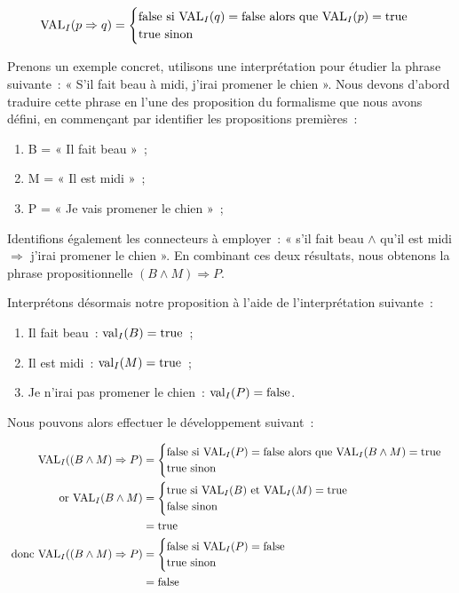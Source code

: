 \[\mathrm{VAL}_I(p \Rightarrow q) = \begin{cases}
  \mathrm{false} \mbox{ si } \mathrm{VAL}_I(q) = \mathrm{false} \mbox{ alors que } \mathrm{VAL}_I(p) = \mathrm{true} \\
  \mathrm{true}\mbox{ sinon}
\end{cases}\]

Prenons un exemple concret, utilisons une interprétation pour étudier la phrase
suivante~: « S'il fait beau à midi, j'irai promener le chien ». Nous devons
d’abord traduire cette phrase en l’une des proposition du formalisme que nous
avons défini, en commençant par identifier les propositions premières~:

\begin{enumerate}
\item B = « Il fait beau »~;
\item M = « Il est midi »~;
\item P = « Je vais promener le chien »~;
\end{enumerate}

Identifions également les connecteurs à employer~: « s’il fait beau $\land$
  qu'il est midi $\Rightarrow$ j’irai promener le chien ». En combinant ces deux
résultats, nous obtenons la phrase propositionnelle $(B \land M) \Rightarrow P$.

Interprétons désormais notre proposition à l’aide de l’interprétation suivante~:
\begin{enumerate}
  \item Il fait beau~: $\mathrm{val}_I(B) = \mathrm{true}$~;
  \item Il est midi~: $\mathrm{val}_I(M) = \mathrm{true}$~;
  \item Je n’irai pas promener le chien~: $\mathrm{val}_I(P) = \mathrm{false}$.
\end{enumerate}

Nous pouvons alors effectuer le développement suivant~:

\begin{align*}
  \mathrm{VAL}_I((B \land M) \Rightarrow P) &= \begin{cases}
    \mathrm{false} \mbox{ si } \mathrm{VAL}_I(P) = \mathrm{false} \mbox{ alors que } \mathrm{VAL}_I(B \land M) = \mathrm{true} \\
    \mathrm{true}\mbox{ sinon}
  \end{cases} \\
  \mbox{ or }\mathrm{VAL}_I(B \land M) &= \begin{cases}
    \mathrm{true} \mbox{ si } \mathrm{VAL}_I(B) \mbox{ et } \mathrm{VAL}_I(M) = \mathrm{true} \\
    \mathrm{false}\mbox{ sinon}
  \end{cases} \\
  &= \mathrm{true} \\
  \mbox{ donc }  \mathrm{VAL}_I((B \land M) \Rightarrow P) &= \begin{cases}
    \mathrm{false} \mbox{ si } \mathrm{VAL}_I(P) = \mathrm{false} \\
    \mathrm{true}\mbox{ sinon}
  \end{cases} \\
  &= \mathrm{false}
\end{align*}

